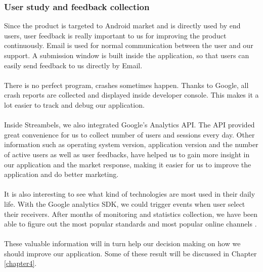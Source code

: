 \subsubsection{User study and feedback collection}
Since the product is targeted to Android market and is directly used by end users, user feedback is really important to us for improving the product continuously. Email is used for normal communication between the user and our support. A submission window is built inside the application, so that users can easily send feedback to us directly by Email.\\
\\
There is no perfect program, crashes sometimes happen. Thanks to Google, all crash reports are collected and displayed inside developer console. This makes it a lot easier to track and debug our application.\\
\\
Inside Streambels, we also integrated Google's Analytics API. The API provided great convenience for us to collect number of users and sessions every day. Other information such as operating system version, application version and the number of active users as well as user feedbacks, have helped us to gain more insight in our application and the market response, making it easier for us to improve the application and do better marketing.\\ 
\\
It is also interesting to see what kind of technologies are most used in their daily life. With the Google analytics SDK, we could trigger events when user select their receivers. After months of monitoring and statistics collection, we have been able to figure out the most popular standards and most popular online channels .\\
\\
These valuable information will in turn help our decision making on how we should improve our application. Some of these result will be discussed in Chapter \ref{chapter4}.